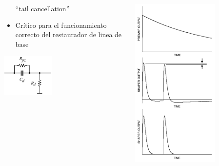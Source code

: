 \documentclass{beamer}
\begin{document}
\begin{frame}
\begin{columns}
\begin{column}{0.6\textwidth}
\begin{itemize}
``tail cancellation''
\item Crítico para el funcionamiento correcto del restaurador de linea de base
\end{itemize}
\begin{center}
\includegraphics[width=0.4\textwidth]{d2/rpz_added}
\end{center}
\end{column}
\begin{column}{0.4\textwidth}
\begin{center}
\includegraphics[width=0.7\textwidth]{d2/pz_graphs}
\end{center}
\end{column}
\end{columns}
\end{frame} 
\end{document}
